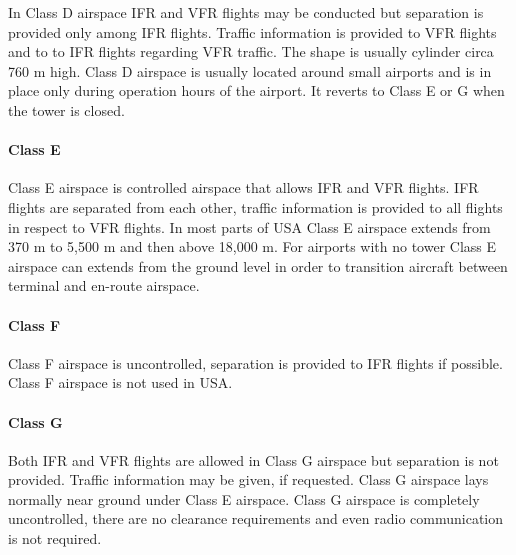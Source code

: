 In Class D airspace IFR and VFR flights may be conducted but separation is provided only among IFR flights. Traffic information is provided to VFR flights and to to IFR flights regarding VFR traffic. The shape is usually cylinder circa 760 m high. Class D airspace is usually located around small airports and is in place only during operation hours of the airport. It reverts to Class E or G when the tower is closed.

\paragraph{Class E}

Class E airspace is controlled airspace that allows IFR and VFR flights. IFR flights are separated from each other, traffic information is provided to all flights in respect to VFR flights. In most parts of USA Class E airspace extends from 370 m to 5,500 m and then above 18,000 m. For airports with no tower Class E airspace can extends from the ground level in order to transition aircraft between terminal and en-route airspace. \cite{nolan}

\paragraph{Class F}

Class F airspace is uncontrolled, separation is provided to IFR flights if possible. Class F airspace is not used in USA.

\paragraph{Class G}

Both IFR and VFR flights are allowed in Class G airspace but separation is not provided. Traffic information may be given, if requested. Class G airspace lays normally near ground under Class E airspace. Class G airspace is completely uncontrolled, there are no clearance requirements and even radio communication is not required.